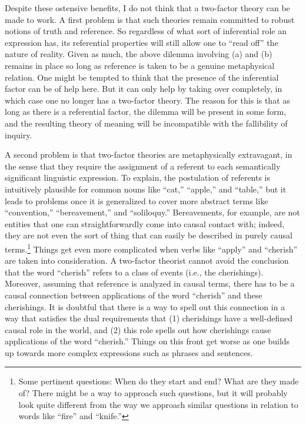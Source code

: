 Despite these ostensive benefits, I do not think that a two-factor theory can be made to work. A first problem is that such theories remain committed to robust notions of truth and reference. So regardless of what sort of inferential role an expression has, its referential properties will still allow one to ``read off'' the nature of reality. Given as much, the above dilemma involving (a) and (b) remains in place so long as reference is taken to be a genuine metaphysical relation. One might be tempted to think that the presence of the inferential factor can be of help here. But it can only help by taking over completely, in which case one no longer has a two-factor theory. The reason for this is that as long as there is a referential factor, the dilemma will be present in some form, and the resulting theory of meaning will be incompatible with the fallibility of inquiry. 

A second problem is that two-factor theories are metaphysically extravagant, in the sense that they require the assignment of a referent to each semantically significant linguistic expression. To explain, the postulation of referents is intuitively plausible for common nouns like ``cat,'' ``apple,'' and ``table,'' but it leads to problems once it is generalized to cover more abstract terms like ``convention,'' ``bereavement,'' and ``soliloquy.'' Bereavements, for example, are not entities that one can straightforwardly come into causal contact with; indeed, they are not even the sort of thing that can easily be described in purely causal terms.\footnote{Some pertinent questions: When do they start and end? What are they made of? There might be a way to approach such questions, but it will probably look quite different from the way we approach similar questions in relation to words like ``fire'' and ``knife.''} Things get even more complicated when verbs like ``apply'' and ``cherish'' are taken into consideration. A two-factor theorist cannot avoid the conclusion that the word ``cherish'' refers to a class of events (i.e., the cherishings). Moreover, assuming that reference is analyzed in causal terms, there has to be a causal connection between applications of the word ``cherish'' and these cherishings. It is doubtful that there is a way to spell out this connection in a way that satisfies the dual requirements that (1) cherishings have a well-defined causal role in the world, and (2) this role spells out how cherishings cause applications of the word ``cherish.'' Things on this front get worse as one builds up towards more complex expressions such as phrases and sentences. 

